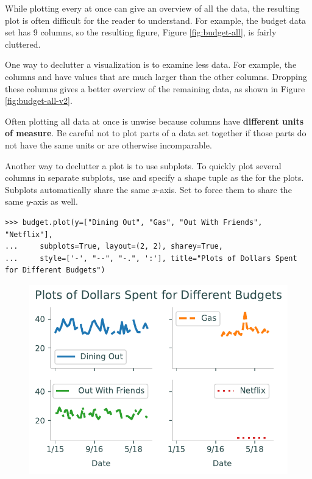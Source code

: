 While plotting every  at once can give an overview of all the data, the resulting plot is often difficult for the reader to understand.
For example, the budget data set has 9 columns, so the resulting figure, Figure \ref{fig:budget-all}, is fairly cluttered.

One way to declutter a visualization is to examine less data.
For example, the columns  and  have values that are much larger than the other columns.
Dropping these columns gives a better overview of the remaining data, as shown in Figure \ref{fig:budget-all-v2}.

\begin{warn}
Often plotting all data at once is unwise because columns have \textbf{different units of measure}.
Be careful not to plot parts of a data set together if those parts do not have the same units or are otherwise incomparable.
\end{warn}

Another way to declutter a plot is to use subplots.
To quickly plot several columns in separate subplots, use  and specify a shape tuple as the  for the plots.
Subplots automatically share the same $x$-axis.
Set  to force them to share the same $y$-axis as well.

\begin{lstlisting}
>>> budget.plot(y=["Dining Out", "Gas", "Out With Friends", "Netflix"],
... 	subplots=True, layout=(2, 2), sharey=True,
... 	style=['-', "--", "-.", ':'], title="Plots of Dollars Spent for Different Budgets")
\end{lstlisting}

\begin{figure}[H]
    \includegraphics[width=.8\textwidth]{figures/line_subplots.pdf}
\end{figure}

